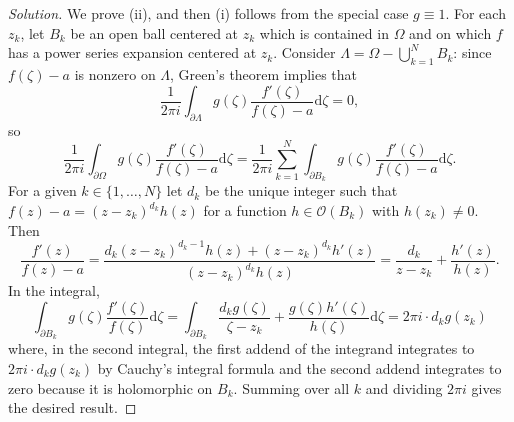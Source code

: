 \documentclass[10pt]{article}
\newcommand{\dd}{\mathrm{d}}
\newenvironment{soln}{\begin{proof}[Solution]}{\end{proof}}
\begin{document}
\begin{soln}
    We prove (ii), and then (i) follows from the special case $g \equiv 1$.
    For each $z_k$, let $B_k$ be an open ball centered at $z_k$
    which is contained in $\Omega$
    and on which $f$ has a power series expansion centered at $z_k$.
    Consider $\Lambda = \Omega - \bigcup_{k=1}^N B_k$:
    since $f(\zeta) - a$ is nonzero on $\Lambda$,
    Green's theorem implies that
    \begin{equation*}
	\frac 1{2\pi i}\int_{\partial\Lambda}
	g(\zeta)\frac{f'(\zeta)}{f(\zeta)-a}\dd\zeta = 0,
    \end{equation*}
    so
    \begin{equation*}
	\frac 1{2\pi i}\int_{\partial\Omega}
	g(\zeta)\frac{f'(\zeta)}{f(\zeta)-a}\dd\zeta
	= \frac 1{2\pi i}\sum_{k=1}^N\int_{\partial B_k}
	g(\zeta)\frac{f'(\zeta)}{f(\zeta)-a}\dd\zeta.
    \end{equation*}
    For a given $k\in\{1,\dots,N\}$ let $d_k$ be the unique integer
    such that $f(z) - a = (z-z_k)^{d_k}h(z)$ for a function
    $h\in\mathcal O(B_k)$ with $h(z_k)\ne 0$. Then
    \begin{equation*}
	\frac{f'(z)}{f(z) - a} = \frac{d_k(z-z_k)^{d_k-1}h(z)
	+ (z-z_k)^{d_k}h'(z)}{(z-z_k)^{d_k}h(z)}
	= \frac{d_k}{z-z_k} + \frac{h'(z)}{h(z)}.
    \end{equation*}
    In the integral,
    \begin{equation*}
	\int_{\partial B_k} g(\zeta)\frac{f'(\zeta)}{f(\zeta)}\dd\zeta
	= \int_{\partial B_k} \frac{d_k g(\zeta)}{\zeta-z_k}
	+ \frac{g(\zeta)h'(\zeta)}{h(\zeta)}\dd\zeta
	= 2\pi i\cdot d_kg(z_k)
    \end{equation*}
    where, in the second integral, the first addend of the integrand
    integrates to $2\pi i\cdot d_kg(z_k)$ by Cauchy's integral formula
    and the second addend integrates to zero because
    it is holomorphic on $B_k$.
    Summing over all $k$ and dividing $2\pi i$ gives the desired result.
\end{soln}
\end{document}
